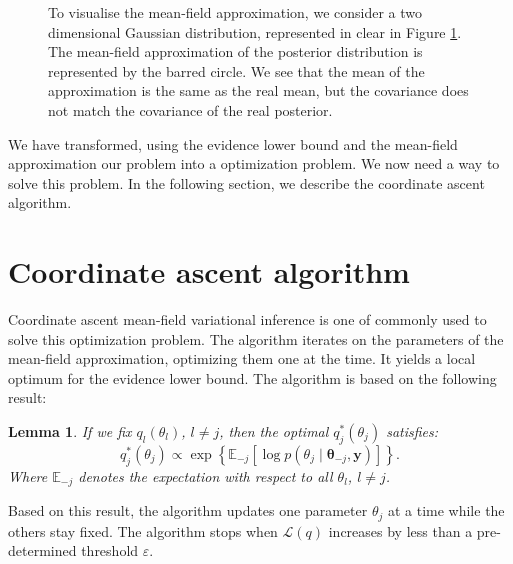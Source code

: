 \documentclass[a4paper, 11pt]{report}
\numberwithin{equation}{chapter}
\newtheorem{lemma}{Lemma}[chapter]
\begin{document}
\begin{figure}[h!]
\centering
{}
\caption{\label{fig:mean_field}To visualise the mean-field approximation, we consider a two dimensional Gaussian distribution, represented in clear in Figure \ref{fig:mean_field}. The mean-field approximation of the posterior distribution is represented by the barred circle. We see that the mean of the approximation is the same as the real mean, but the covariance does not match the covariance of the real posterior.}
\end{figure}

We have transformed, using the evidence lower bound and the mean-field approximation our problem into a optimization problem. We now need a way to solve this problem. In the following section, we describe the coordinate ascent algorithm.
\section{Coordinate ascent algorithm}
Coordinate ascent mean-field variational inference  is one of commonly used to solve this optimization problem. The algorithm iterates on the parameters of the mean-field approximation, optimizing them one at the time. It yields a local optimum for the evidence lower bound. The algorithm is based on the following result:
\begin{lemma}

If we fix $q_l(\theta_l)$, $l\neq j$, then the optimal $q^*_j(\theta_j)$ satisfies:
\begin{equation*}
q^*_j(\theta_j) \propto \exp\left\lbrace\mathbb{E}_{-j}\left[\log p(\theta_j \mid \boldsymbol{\theta}_{-j}, \boldsymbol{y})\right]\right\rbrace.
\end{equation*}
Where $\mathbb{E}_{-j}$ denotes the expectation with respect to all $\theta_l$, $l \neq j$.
\end{lemma}

Based on this result, the algorithm updates one parameter $\theta_j$ at a time while the others stay fixed. The algorithm stops when $\mathcal{L}(q)$ increases by less than a pre-determined threshold $\varepsilon$.
\end{document}
